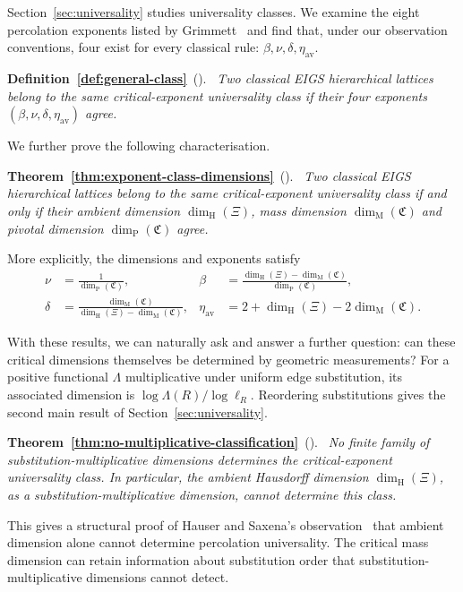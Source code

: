 \documentclass[scheme=plain,11pt]{ctexart}
\theoremstyle{definition}
\theoremstyle{remark}
\newenvironment{restated}[3][]{\par\medskip\noindent\textbf{#2~\ref{#3}}\if\relax\detokenize{#1}\relax\else\ \textup{(#1)}\fi.\ \itshape}{\par\medskip}
\newcommand{\dimhaus}{\dim_{\mathrm H}}
\newcommand{\dimmass}{\dim_{\mathrm M}}
\begin{document}
Section~\ref{sec:universality} studies universality classes.
We examine the eight percolation exponents listed by Grimmett~\cite{grimmett2014criticality} and find that, under our observation conventions, four exist for every classical rule: $\beta,\nu,\delta,\eta_{\mathrm{av}}$.
\begin{restated}{Definition}{def:general-class}
Two classical EIGS hierarchical lattices belong to the same \emph{critical-exponent universality class} if their four exponents $(\beta,\nu,\delta,\eta_{\mathrm{av}})$ agree.
\end{restated}
We further prove the following characterisation.
\begin{restated}{Theorem}{thm:exponent-class-dimensions}
Two classical EIGS hierarchical lattices belong to the same critical-exponent universality class if and only if their ambient dimension $\dimhaus(\Xi)$, mass dimension $\dimmass(\mathfrak C)$ and pivotal dimension $\dim_{\mathrm P}(\mathfrak C)$ agree.
\end{restated}
More explicitly, the dimensions and exponents satisfy
\begin{align*}
 \nu&=\frac{1}{\dim_{\mathrm P}(\mathfrak C)},&
 \beta&=\frac{\dimhaus(\Xi)-\dimmass(\mathfrak C)}{\dim_{\mathrm P}(\mathfrak C)},\\
 \delta&=\frac{\dimmass(\mathfrak C)}{\dimhaus(\Xi)-\dimmass(\mathfrak C)},&
 \eta_{\mathrm{av}}&=2+\dimhaus(\Xi)-2\dimmass(\mathfrak C).
\end{align*}

With these results, we can naturally ask and answer a further question: can these critical dimensions themselves be determined by geometric measurements?
For a positive functional $\Lambda$ multiplicative under uniform edge substitution, its associated dimension is $\log\Lambda(R)/\log\ell_R$.
Reordering substitutions gives the second main result of Section~\ref{sec:universality}.
\begin{restated}{Theorem}{thm:no-multiplicative-classification}
No finite family of substitution-multiplicative dimensions determines the critical-exponent universality class.
In particular, the ambient Hausdorff dimension $\dimhaus(\Xi)$, as a substitution-multiplicative dimension, cannot determine this class.
\end{restated}
This gives a structural proof of Hauser and Saxena's observation~\cite{hauser1986geometrical} that ambient dimension alone cannot determine percolation universality.
The critical mass dimension can retain information about substitution order that substitution-multiplicative dimensions cannot detect.
\end{document}
